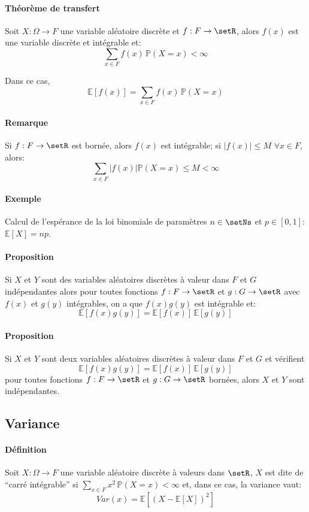 \documentclass[a4paper,10pt,french,openany]{memoir}
\newcommand{\Proba}{\mathbb{P}}
\newcommand{\Esper}{\mathbb{E}}
\newcommand{\Var}{Var}
\newcommand{\abs}[1]{\lvert #1 \rvert}
\begin{document}
\paragraph{Théorème de transfert}
Soit $X:\Omega \rightarrow F$ une variable aléatoire discrète et $f:F \rightarrow \setR$, alors $f(x)$ est une variable discrète et intégrable et: \[\sum_{x\in F} f(x) \,\Proba(X=x) < \infty\]

Dans ce cas, \[\Esper[f(x)] = \sum_{x\in F} f(x) \,\Proba(X=x)\]

\paragraph{Remarque}
Si $f: F\rightarrow\setR$ est bornée, alors $f(x)$ est intégrable; si $\abs{f(x)} \leq M$ $\forall x \in F$, alors: \[\sum_{x\in F} \abs{f(x)} \Proba(X=x) \leq M < \infty\]

\paragraph{Exemple}
Calcul de l'espérance de la loi binomiale de paramètres $n\in\setNs$ et $p\in[0,1]$: $\Esper[X]=n p$.

\paragraph{Proposition}
Si $X$ et $Y$ sont des variables aléatoires discrètes à valeur dans $F$ et $G$ indépendantes alors pour toutes fonctions $f: F\rightarrow \setR$ et $g: G\rightarrow \setR$ avec $f(x)$ et $g(y)$ intégrables, on a que $f(x) g(y)$ est intégrable et:\[\Esper[f(x) g(y)]=\Esper[f(x)] \,\Esper[g(y)]\]

\paragraph{Proposition}
Si $X$ et $Y$ sont deux variables aléatoires discrètes à valeur dans $F$ et $G$ et vérifient \[\Esper[f(x) g(y)] = \Esper[f(x)]\,\Esper[g(y)]\] pour toutes fonctions $f:F\rightarrow \setR$ et $g: G\rightarrow \setR$ bornées, alors $X$ et $Y$ sont indépendantes.

\subsection{Variance}

\paragraph{Définition}
Soit $X:\Omega \rightarrow F$ une variable aléatoire discrète à valeurs dans $\setR$, $X$ est dite de ``carré intégrable'' si $\sum_{x\in F}x^2\, \Proba(X=x) < \infty$ et, dans ce cas, la variance vaut: \[\Var(x)=\Esper[(X-\Esper[X])^2]\]
\end{document}
